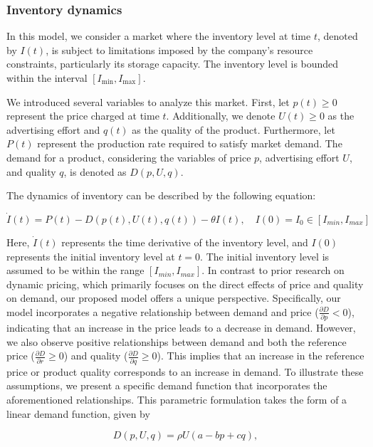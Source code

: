 \documentclass[]{interact}
\theoremstyle{plain}%
\theoremstyle{definition}
\theoremstyle{remark}
\begin{document}
\subsubsection{Inventory dynamics}
In this model, we consider a market where the inventory level at time $t$, denoted by $I(t)$, is subject to limitations imposed by the company's resource constraints, particularly its storage capacity. The inventory level is bounded within the interval $[I_{\text{min}}, I_{\text{max}}]$.

We introduced several variables to analyze this market. First, let $p(t) \geq 0$ represent the price charged at time $t$. Additionally, we denote $U(t) \geq 0$ as the advertising effort and $q(t)$ as the quality of the product. Furthermore, let $P(t)$ represent the production rate required to satisfy market demand. The demand for a product, considering the variables of price $p$, advertising effort $U$, and quality $q$, is denoted as $D(p,U,q)$.


The dynamics of inventory can be described by the following equation:

\begin{equation}\label{inventory}
	\dot{I}(t) = P(t) - D(p(t), U(t), q(t)) -\theta I(t), \quad I(0) = I_{0} \in [I_{min}, I_{max}]
\end{equation}
		
Here, $\dot{I}(t)$ represents the time derivative of the inventory level, and $I(0)$ represents the initial inventory level at $t=0$. The initial inventory level is assumed to be within the range $[I_{min}, I_{max}]$.
In contrast to prior research on dynamic pricing, which primarily focuses on the direct effects of price and quality on demand, our proposed model offers a unique perspective. Specifically, our model incorporates a negative relationship between demand and price ($\frac{\partial D}{\partial p} < 0$), indicating that an increase in the price leads to a decrease in demand. However, we also observe positive relationships between demand and both the reference price ($\frac{\partial D}{\partial r} \geq 0$) and quality ($\frac{\partial D}{\partial q} \geq 0$). This implies that an increase in the reference price or product quality corresponds to an increase in demand.
To illustrate these assumptions, we present a specific demand function that incorporates the aforementioned relationships. This parametric formulation takes the form of a linear demand function, given by

$$
D(p, U, q) = \rho U (a - b p + c q),
$$
\end{document}
